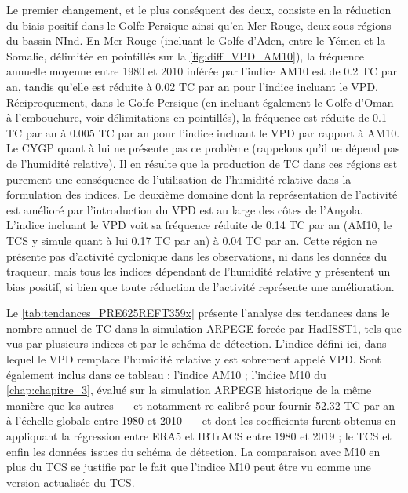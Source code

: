 \documentclass[../main.tex]{subfiles}
\begin{document}
Le premier changement, et le plus conséquent des deux, consiste en la réduction du biais positif dans le Golfe Persique ainsi qu'en Mer Rouge, deux sous-régions
du bassin NInd. En Mer Rouge (incluant le Golfe d'Aden, entre le Yémen et la Somalie, délimitée en pointillés sur la \cref{fig:diff_VPD_AM10}), la fréquence
annuelle moyenne entre \num{1980} et \num{2010} inférée par l'indice AM10 est de \num{0.2} TC par an, tandis qu'elle est réduite à \num{0.02} TC par an pour
l'indice incluant le VPD. Réciproquement, dans le Golfe Persique (en incluant également le Golfe d'Oman à l'embouchure, voir délimitations en pointillés), la
fréquence est réduite de \num{0.1} TC par an à \num{0.005} TC par an pour l'indice incluant le VPD par rapport à AM10. Le CYGP quant à lui ne présente pas ce
problème (rappelons qu'il ne dépend pas de l'humidité relative). Il en résulte que la production de TC dans ces régions est purement une conséquence de
l'utilisation de l'humidité relative dans la formulation des indices. Le deuxième domaine dont la représentation de l'activité est amélioré par l'introduction
du VPD est au large des côtes de l'Angola. L'indice incluant le VPD voit sa fréquence réduite de \num{0.14} TC par an (AM10, le TCS y simule quant à lui
\num{0.17} TC par an) à \num{0.04} TC par an. Cette région ne présente pas d'activité cyclonique dans les observations, ni dans les données du traqueur, mais
tous les indices dépendant de l'humidité relative y présentent un bias positif, si bien que toute réduction de l'activité représente une amélioration.

Le \cref{tab:tendances_PRE625REFT359x} présente l'analyse des tendances dans le nombre annuel de TC dans la simulation ARPEGE forcée par HadISST1, tels que vus
par plusieurs indices et par le schéma de détection. L'indice défini ici, dans lequel le VPD remplace l'humidité relative y est sobrement appelé VPD. Sont
également inclus dans ce tableau : l'indice AM10 ; l'indice M10 du \cref{chap:chapitre_3}, évalué sur la simulation ARPEGE historique de la même manière que les
autres ---~et notamment re-calibré pour fournir \num{52.32} TC par an à l'échelle globale entre \num{1980} et \num{2010}~--- et dont les coefficients furent
obtenus en appliquant la régression entre ERA5 et IBTrACS entre \num{1980} et \num{2019} ; le TCS et enfin les données issues du schéma de détection. La
comparaison avec M10 en plus du TCS se justifie par le fait que l'indice M10 peut être vu comme une version actualisée du TCS.
\end{document}
